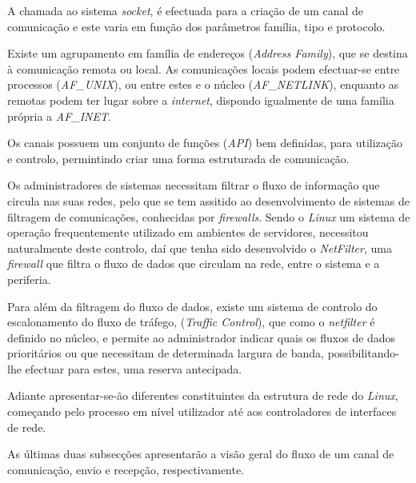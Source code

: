 A chamada ao sistema \textit{socket}, é efectuada para a criação de um canal de comunicação e este varia em função dos parâmetros família, tipo e protocolo.

Existe um agrupamento em família de endereços (\textit{Address Family}), que se destina à comunicação remota ou local.
As comunicações locais podem efectuar-se entre processos (\textit{AF\_UNIX}), ou entre estes e o núcleo (\textit{AF\_NETLINK}), enquanto as remotas podem ter lugar sobre a \textit{internet}, dispondo igualmente de uma família própria a \textit{AF\_INET}.

Os canais possuem um conjunto de funções (\textit{API}) bem definidas, para utilização e controlo, permintindo criar uma forma estruturada de comunicação.

Os administradores de sistemas necessitam filtrar o fluxo de informação que circula nas suas redes, pelo que se tem assitido ao desenvolvimento de sistemas de filtragem de comunicações, conhecidas por \textit{firewalls}.
Sendo o \textit{Linux} um sistema de operação frequentemente utilizado em ambientes de servidores, necessitou naturalmente deste controlo, daí que tenha sido desenvolvido o \textit{NetFilter}, uma \textit{firewall} que \color{red}filtra \color{black}o fluxo de dados que circulam na rede, entre o sistema e a periferia.

Para além da filtragem do fluxo de dados, existe um sistema de controlo do escalonamento do fluxo de tráfego, (\textit{Traffic Control}), que como o \textit{netfilter} é definido no núcleo, e permite ao administrador indicar quais os fluxos de dados prioritários ou que necessitam de determinada largura de banda, possibilitando-lhe efectuar para estes, uma reserva antecipada.
 
Adiante apresentar-se-ão diferentes constituintes da estrutura de rede do \textit{Linux}, começando pelo processo em nível utilizador até aos controladores de interfaces de rede.

\color{red}As últimas duas subsecções apresentarão a visão geral do fluxo de um canal de comunicação, envio e recepção, respectivamente.\color{black}


